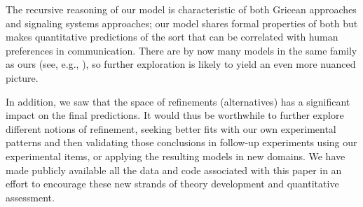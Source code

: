 \documentclass[leqno,12pt]{article}
\begin{document}
The recursive reasoning of our model is characteristic of both Gricean
approaches and signaling systems approaches; our model shares formal
properties of both but makes quantitative predictions of the sort that
can be correlated with human preferences in communication. There are
by now many models in the same family as ours (see, e.g.,
\citealt{CamererHo:2004,Jaeger:2011,Smith:Goodman:Frank:2013,Kao-etal:2014,Jaeger:Franke:2014}),
so further exploration is likely to yield an even more nuanced
picture.

In addition, we saw that the space of refinements (alternatives) has a
significant impact on the final predictions. It would thus be
worthwhile to further explore different notions of refinement, seeking
better fits with our own experimental patterns and then validating
those conclusions in follow-up experiments using our experimental
items, or applying the resulting models in new domains.  We have made
publicly available all the data and code associated with this paper in
an effort to encourage these new strands of theory development and
quantitative assessment.

\end{document}

